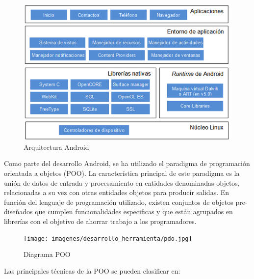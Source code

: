 \documentclass[a4paper,11pt]{book}
\begin{document}
\begin{figure}[H] 
\centering 
\includegraphics[scale=0.5]{imagenes/desarrollo_herramienta/android.png}
\caption{ Arquitectura Android\cite{arqAndroid}}
\end{figure}

Como parte del desarrollo Android, se ha utilizado el paradigma de programación orientada a objetos (POO)\cite{ood}. La característica principal de este paradigma es la unión de datos de entrada y procesamiento en entidades denominadas objetos,  relacionadas a su vez con otras entidades objetos para producir salidas. En función del lenguaje de programación utilizado, existen conjuntos de objetos pre-diseñados que cumplen funcionalidades especificas y que están agrupados en librerías con el objetivo de ahorrar trabajo a los programadores.


\begin{figure}[H] 
\centering 
\texttt{[image: imagenes/desarrollo\_herramienta/pdo.jpg]}
\caption{ Diagrama POO\cite{poo}}
\end{figure}


Las principales técnicas de la POO se pueden clasificar en:
\end{document}
